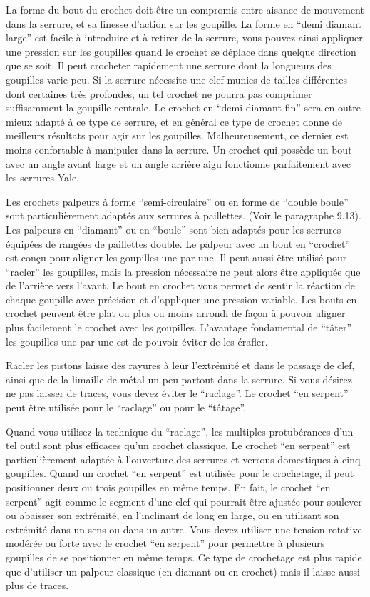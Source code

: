 \documentclass[a4paper,french,11pt,twoside]{report}
\begin{document}
La forme du bout du crochet doit être un compromis entre aisance de mouvement dans la serrure, et sa finesse d'action sur les goupille. La forme en \enquote{demi diamant large} est facile à introduire et à retirer de la serrure, vous pouvez ainsi appliquer une pression sur les goupilles quand le crochet se déplace dans quelque direction que se soit. Il peut crocheter rapidement une serrure dont la longueurs des goupilles varie peu. Si la serrure nécessite une clef munies de tailles différentes dont certaines très profondes, un tel crochet ne pourra pas comprimer suffisamment la goupille centrale. Le crochet en \enquote{demi diamant fin} sera en outre mieux adapté à ce type de serrure, et en général ce type de crochet donne de meilleurs résultats pour agir sur les goupilles. Malheureusement, ce dernier est moins confortable à manipuler dans la serrure. Un crochet qui possède un bout avec un angle avant large et un angle arrière aigu fonctionne parfaitement avec les serrures Yale.

Les crochets palpeurs à forme \enquote{semi-circulaire} ou en forme de \enquote{double boule} sont particulièrement adaptés aux serrures à paillettes. (Voir le paragraphe 9.13). Les palpeurs en \enquote{diamant} ou en \enquote{boule} sont bien adaptés pour les serrures équipées de rangées de paillettes double. Le palpeur avec un bout en \enquote{crochet} est conçu pour aligner les goupilles une par une. Il peut aussi être utilisé pour \enquote{racler} les goupilles, mais la pression nécessaire ne peut alors être appliquée que de l'arrière vers l'avant. Le bout en crochet vous permet de sentir la réaction de chaque goupille avec précision et d'appliquer une pression variable. Les bouts en crochet peuvent être plat ou plus ou moins arrondi de façon à pouvoir aligner plus facilement le crochet avec les goupilles. L'avantage fondamental de \enquote{tâter} les goupilles une par une est de pouvoir éviter de les érafler.

Racler les pistons laisse des rayures à leur l'extrémité et dans le passage de clef, ainsi que de la limaille de métal un peu partout dans la serrure. Si vous désirez ne pas laisser de traces, vous devez éviter le \enquote{raclage}. Le crochet \enquote{en serpent} peut être utilisée pour le \enquote{raclage} ou pour le \enquote{tâtage}.

Quand vous utilisez la technique du \enquote{raclage}, les multiples protubérances d'un tel outil sont plus efficaces qu'un crochet classique. Le crochet \enquote{en serpent} est particulièrement adaptée à l'ouverture des serrures et verrous domestiques à cinq goupilles. Quand un crochet \enquote{en serpent} est utilisée pour le crochetage, il peut positionner deux ou trois goupilles en même temps. En fait, le crochet \enquote{en serpent} agit comme le segment d'une clef qui pourrait être ajustée pour soulever ou abaisser son extrémité, en l'inclinant de long en large, ou en utilisant son extrémité dans un sens ou dans un autre. Vous devez utiliser une tension rotative modérée ou forte avec le crochet \enquote{en serpent} pour permettre à plusieurs goupilles de se positionner en même temps. Ce type de crochetage est plus rapide que d'utiliser un palpeur classique (en diamant ou en crochet) mais il laisse aussi plus de traces.
\end{document}
